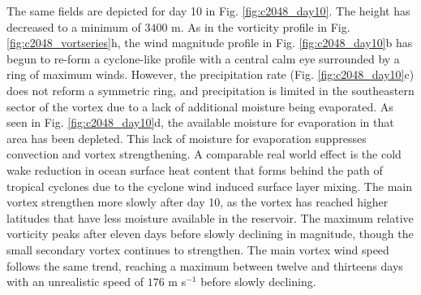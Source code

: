 \documentclass{ametsoc}
\begin{document}
    The same fields are depicted
   for day 10 in Fig. \ref{fig:c2048_day10}. The height has decreased to a minimum of $3400$ m.
   As in the vorticity profile in Fig. \ref{fig:c2048_vortseries}h, the wind magnitude profile in 
   Fig. \ref{fig:c2048_day10}b has begun to re-form a cyclone-like profile with a central calm eye
   surrounded by a ring of maximum winds. However, the precipitation rate 
   (Fig. \ref{fig:c2048_day10}c) does not reform a symmetric ring, and precipitation is limited
   in the southeastern sector of the vortex due to a lack of additional moisture
   being evaporated. As seen in Fig. \ref{fig:c2048_day10}d, the available moisture
   for evaporation in that area has been depleted. This lack of moisture for evaporation suppresses 
   convection and vortex strengthening. A comparable real world effect is
   the cold wake reduction in ocean surface heat content that forms 
   behind the path of tropical cyclones due to the cyclone wind induced surface layer mixing.  
   The main vortex strengthen more slowly
   after day 10, as the vortex has reached higher latitudes that have less 
   moisture available in the reservoir. The maximum relative vorticity peaks after eleven days before slowly
   declining in magnitude, though the small secondary vortex continues to strengthen. 
   The main vortex wind speed follows the same trend, reaching a maximum between twelve and thirteens days with an unrealistic
   speed of $176$ m s$^{-1}$ before slowly declining. 
           
\end{document}
